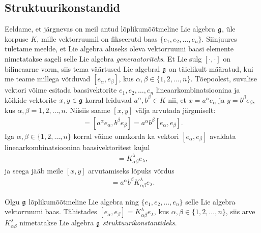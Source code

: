 \subsection{Struktuurikonstandid}

Eeldame, et järgnevas on meil antud lõplikumõõtmeline Lie algebra $\mathfrak{g}$,
üle korpuse $K$, mille vektorruumil on fikseerutd baas
$\{ e_1, e_2, \dots, e_n \}$. Siinjuures tuletame meelde, et Lie algebra
aluseks oleva vektorruumi baasi elemente nimetatakse sageli selle
Lie algebra \emph{generaatoriteks}. Et Lie sulg
$[\cdot, \cdot]$ on bilineaarne vorm, siis tema väärtused Lie algebral
$\mathfrak{g}$ on täielikult määratud, kui me teame millega võrduvad
$[e_\alpha, e_\beta]$, kus $\alpha, \beta \in \{1, 2, \dots, n\}$.
Tõepoolest, suvalise vektori võime esitada baasivektorite
$e_1, e_2, \dots, e_n$ lineaarkombinatsioonina ja kõikide vektorite
$x, y \in \mathfrak{g}$ korral leiduvad $a^\alpha, b^\beta \in K$ nii, et
$x = a^\alpha e_\alpha$ ja $y = b^\beta e_\beta$, kus
$\alpha, \beta = 1, 2, \dots, n$. Niisiis saame $[x, y]$ välja arvutada
järgmiselt:
\begin{align*}
    [x, y] = [a^\alpha e_\alpha, b^\beta e_\beta] =
    a^\alpha b^\beta [e_\alpha, e_\beta].
\end{align*}
Iga $\alpha, \beta \in \{1, 2, \dots, n\}$ korral võime omakorda ka
vektori $[e_\alpha, e_\beta]$ avaldata lineaarkombinatsioonina
baasivektoritest kujul
\begin{align*}
    [e_\alpha, e_\beta] = K_{\alpha \beta}^{\lambda} e_\lambda,
\end{align*}
ja seega jääb meile $[x, y]$ arvutamiseks lõpuks võrdus
\begin{align*}
    [x, y] = a^\alpha b^\beta K_{\alpha \beta}^{\lambda} e_\lambda.
\end{align*}

\begin{dfn}
    Olgu $\mathfrak{g}$ lõplikumõõtmeline Lie algebra ning $\{ e_1, e_2, \dots, e_n \}$
    selle Lie algebra vektorruumi baas. Tähistades
    $[e_\alpha, e_\beta] = K_{\alpha \beta}^{\lambda} e_\lambda$, kus
    $\alpha, \beta \in \{1, 2, \dots, n\}$, siis arve
    $K_{\alpha \beta}^{\lambda}$ nimetatakse Lie algebra $\mathfrak{g}$
    \emph{struktuurikonstantideks}.
\end{dfn}

